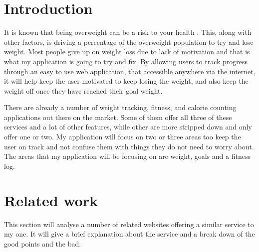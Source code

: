 \section{Introduction}
It is known that being overweight can be a risk to your health \citep{theordre:1985}. This, along with other factors, is driving a percentage of the overweight population to try and lose weight. Most people give up on weight loss due to lack of motivation and that is what my application is going to try and fix. By allowing users to track progress through an easy to use web application, that accessible anywhere via the internet, it will help keep the user motivated to keep losing the weight, and also keep the weight off once they have reached their goal weight.

There are already a number of weight tracking, fitness, and calorie counting applications out there on the market. Some of them offer all three of these services and a lot of other features, while other are more stripped down and only offer one or two. My application will focus on two or three areas too keep the user on track and not confuse them with things they do not need to worry about. The areas that my application will be focusing on are weight, goals and a fitness log.

\section{Related work}
This section will analyse a number of related websites offering a similar service to my one. It will give a brief explanation about the service and a break down of the good points and the bad.

